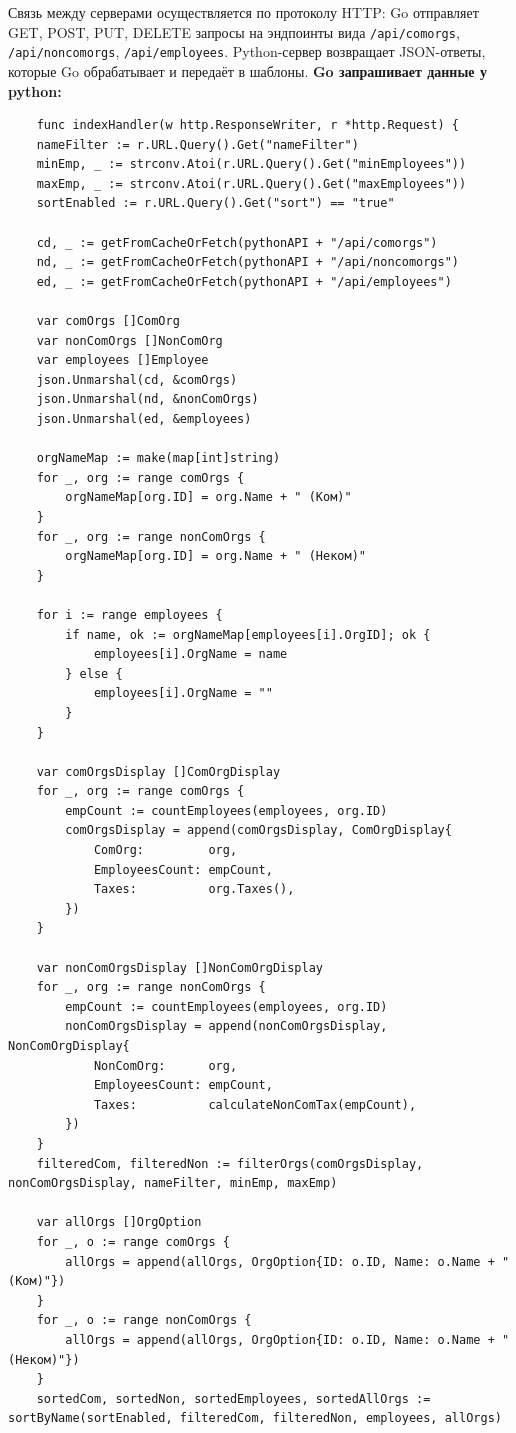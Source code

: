 \documentclass[oneside,a4paper,14pt]{extarticle}
\begin{document}
Связь между серверами осуществляется по протоколу HTTP: Go отправляет GET, POST, PUT, DELETE запросы на эндпоинты вида \texttt{/api/comorgs}, \texttt{/api/noncomorgs}, \texttt{/api/employees}. Python-сервер возвращает JSON-ответы, которые Go обрабатывает и передаёт в шаблоны.
\newpage
\textbf{Go запрашивает данные у python:}
\begin{small}

\begin{verbatim}
    func indexHandler(w http.ResponseWriter, r *http.Request) {
	nameFilter := r.URL.Query().Get("nameFilter")
	minEmp, _ := strconv.Atoi(r.URL.Query().Get("minEmployees"))
	maxEmp, _ := strconv.Atoi(r.URL.Query().Get("maxEmployees"))
	sortEnabled := r.URL.Query().Get("sort") == "true"

	cd, _ := getFromCacheOrFetch(pythonAPI + "/api/comorgs")
	nd, _ := getFromCacheOrFetch(pythonAPI + "/api/noncomorgs")
	ed, _ := getFromCacheOrFetch(pythonAPI + "/api/employees")

	var comOrgs []ComOrg
	var nonComOrgs []NonComOrg
	var employees []Employee
	json.Unmarshal(cd, &comOrgs)
	json.Unmarshal(nd, &nonComOrgs)
	json.Unmarshal(ed, &employees)

	orgNameMap := make(map[int]string)
	for _, org := range comOrgs {
		orgNameMap[org.ID] = org.Name + " (Ком)"
	}
	for _, org := range nonComOrgs {
		orgNameMap[org.ID] = org.Name + " (Неком)"
	}

	for i := range employees {
		if name, ok := orgNameMap[employees[i].OrgID]; ok {
			employees[i].OrgName = name
		} else {
			employees[i].OrgName = ""
		}
	}

	var comOrgsDisplay []ComOrgDisplay
	for _, org := range comOrgs {
		empCount := countEmployees(employees, org.ID)
		comOrgsDisplay = append(comOrgsDisplay, ComOrgDisplay{
			ComOrg:         org,
			EmployeesCount: empCount,
			Taxes:          org.Taxes(),
		})
	}

	var nonComOrgsDisplay []NonComOrgDisplay
	for _, org := range nonComOrgs {
		empCount := countEmployees(employees, org.ID)
		nonComOrgsDisplay = append(nonComOrgsDisplay, NonComOrgDisplay{
			NonComOrg:      org,
			EmployeesCount: empCount,
			Taxes:          calculateNonComTax(empCount),
		})
	}
	filteredCom, filteredNon := filterOrgs(comOrgsDisplay, nonComOrgsDisplay, nameFilter, minEmp, maxEmp)

	var allOrgs []OrgOption
	for _, o := range comOrgs {
		allOrgs = append(allOrgs, OrgOption{ID: o.ID, Name: o.Name + " (Ком)"})
	}
	for _, o := range nonComOrgs {
		allOrgs = append(allOrgs, OrgOption{ID: o.ID, Name: o.Name + " (Неком)"})
	}
	sortedCom, sortedNon, sortedEmployees, sortedAllOrgs := sortByName(sortEnabled, filteredCom, filteredNon, employees, allOrgs)


\end{verbatim}
\end{small}
\end{document}
